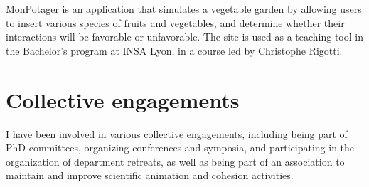 \documentclass[11pt,a4paper]{moderncv}
\begin{document}
 {MonPotager is an application that simulates a vegetable garden by allowing users to insert various species of fruits and vegetables, and determine whether their interactions will be favorable or unfavorable. The site is used as a teaching tool in the Bachelor's program at INSA Lyon, in a course led by Christophe Rigotti.}


\newpage
\section{Collective engagements}
I have been involved in various collective engagements, including being part of PhD committees, organizing conferences and symposia, and participating in the organization of department retreats, as well as being part of an association to maintain and improve scientific animation and cohesion activities.\vspace*{1em}\\
\end{document}
